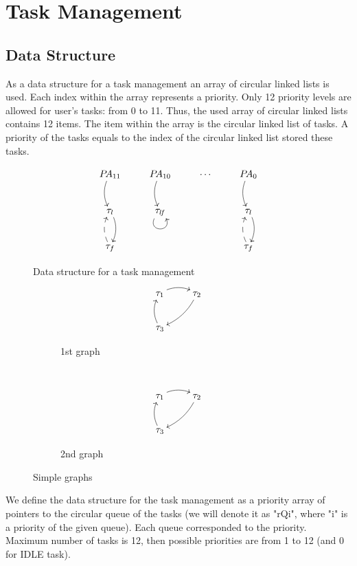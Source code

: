 \section{Task Management}
\subsection{Data Structure}

As a data structure for a task management an array of circular linked
lists is used. Each index within the array represents a priority. Only
12 priority levels are allowed for user's tasks:  from 0 to 11. Thus,
the used array of circular linked lists contains 12 items. The item
within the array is the circular linked list of tasks. A priority of the
tasks equals to the index of the circular linked list stored these
tasks.

\begin{figure}[h]\centering\[\xymatrix{
	P\!A_{11} \ar@/_/[d] 
	& P\!A_{10} \ar@/_/[d] 
	& \cdots 
	& P\!A_{0} \ar@/_/[d] 
	\\
	\tau_{l} \ar@/^/[d] 
	& \tau_{l\!f} \ar@(dl,dr) 
	& 
	& \tau_{l} \ar@/^/[d]
	\\
	\tau_{f} \ar@/^/@{-->}[u] 
	& 
	& 
	& \tau_{f} \ar@/^/@{-->}[u]}\]
  \caption{Data structure for a task management}\label{fig:tmds}
\end{figure}

\begin{figure}[h]
	\centering
	\begin{subfigure}[h]{0.3\textwidth}
		\[
		  	\xymatrix{
				\tau_1  \ar@/^/[r]
				&\tau_2 \ar@/^/[ld] \\
				\tau_3 \ar@/^/[u]}
		\]
		\caption{1st graph}\label{fig:1st_graph}
	\end{subfigure}
	~
	\begin{subfigure}[h]{0.3\textwidth}
		\[
			\xymatrix{
				\tau_1  \ar@/^/[r]
				&\tau_2 \ar@/^/[ld] \\
				\tau_3 \ar@/^/[u]}
		\]
		\caption{2nd graph}\label{fig:2nd_graph}
	\end{subfigure}
	\caption{Simple graphs}\label{fig:graphs}
\end{figure}


We define the data structure for the task management as a priority array
of pointers to the circular queue of the tasks (we will denote it as
"rQi", where "i" is a priority of the given queue). Each queue
corresponded to the priority. Maximum number of tasks is 12, then
possible priorities are from 1 to 12 (and 0 for IDLE task).

